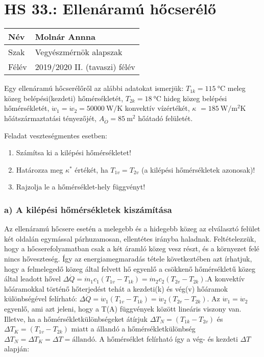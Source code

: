 		
\section*{HS 33.: Ellenáramú hőcserélő}	

\begin{tabular}{ | p{2cm} | p{14cm} | } 
	\hline
	Név & Molnár Annna \\ 
	\hline
	Szak & Vegyészmérnök alapszak \\ 
	\hline
	Félév & 2019/2020 II. (tavaszi) félév \\ 
	\hline
\end{tabular}
\vspace{0.5cm}

\noindent
 Egy ellenáramú hőcserélőről az alábbi adatokat ismerjük:
$T_{1k} = \SI{115}{\celsius}$ meleg közeg belépési(kezdeti) hőmérsékletét,
$T_{2k} = \SI{18}{\celsius}$ hideg közeg belépési hőmérsékletét,
$\dot{w}_1 = \dot{w}_2 =\SI{50000}{\watt\per\kelvin}$ konvektív vízértékét,
$\kappa$ $= \SI{185}{\watt\per\meter\squared\kelvin}$ hőátszármaztatási tényezőjét,
$A_{\ddot{O}} = \SI{85}{\meter\squared}$ hőátadó felületét.
\vspace{5mm}

\noindent
Feladat veszteségmentes esetben:
\begin{enumerate}[label=\alph*)]
 \item Számítsa ki a kilépési hőmérsékletet! 
 \item Határozza meg $\kappa^ *$ értékét, ha $T_{1v} = T_{2v}$ (a kilépési hőmérsékletek azonosak)!
\item Rajzolja le a hőmérséklet-hely függvényt!
\end{enumerate}
\vspace{5mm}
\subsubsection*{a) A kilépési hőmérsékletek kiszámítása}

 Az ellenáramú hőcsere esetén a melegebb és a hidegebb közeg az elválasztó felület két oldalán egymással párhuzamosan, ellentétes irányba haladnak. Feltételezzük, hogy a hőcserefolyamatban csak a két áramló közeg vesz részt, és a környezet felé nincs hőveszteség. Így az energiamegmaradás tétele következtében azt írhatjuk, hogy a felmelegedő közeg által felvett hő egyenlő a csökkenő hőmérsékletű közeg által leadott hővel $\Delta \dot{Q} = \dot{m}_1{c}_1 \left(T_{1v} - T_{1k}\right)=\dot{m}_2{c}_2 \left(T_{2v} - T_{2k}\right)$.A konvektív hőáramokkal történő  hőterjedést tehát a kezdeti(k) és vég(v) hőáramok különbségével felírható: $\Delta \dot{Q} = \dot{w}_1 \left(T_{1v} - T_{1k}\right)=\dot{w}_2 \left(T_{2v} - T_{2k}\right)$.
 Az $\dot{w}_1 = \dot{w}_2$ egyenlő, ami azt jeleni, hogy a T(A) függvények között lineáris viszony van. Illetve, ha a hőmérsékletkülönbségeket átírjuk $\Delta T_N =\left(T_{1k} - T_{2v}\right)$ és $\Delta T_K= \left(T_{1v} - T_{2k}\right)$ miatt a állandó a hőmérsékletkülönbség $\Delta T_N = \Delta T_K = \Delta T = \textrm{állandó}$. A hőmérséklet felírható így a vég- és kezdeti $\Delta T$ alapján:
 
